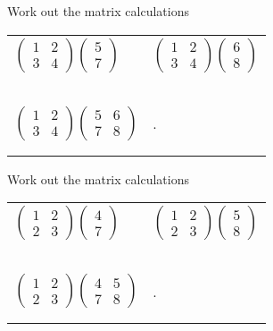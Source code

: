 \documentclass[fontsize=20pt]{scrartcl}
\begin{document}
\newpage
Work out the matrix calculations
\newline
\newline
\begin{tabular}{p{13cm}p{13cm}}
$\begin{pmatrix}1&2\\3&4\end{pmatrix} \begin{pmatrix}5\\7\end{pmatrix}$
&$\begin{pmatrix}1&2\\3&4\end{pmatrix} \begin{pmatrix}6\\8\end{pmatrix}$
\\\\\\
\\\\\\

$\begin{pmatrix}1&2\\3&4\end{pmatrix} \begin{pmatrix}5&6\\7&8\end{pmatrix}$
&.
\\\\\\
\end{tabular}
\newpage
Work out the matrix calculations
\newline
\newline
\begin{tabular}{p{13cm}p{13cm}}
$\begin{pmatrix}1&2\\2&3\end{pmatrix} \begin{pmatrix}4\\7\end{pmatrix}$
&$\begin{pmatrix}1&2\\2&3\end{pmatrix} \begin{pmatrix}5\\8\end{pmatrix}$
\\\\\\
\\\\\\

$\begin{pmatrix}1&2\\2&3\end{pmatrix} \begin{pmatrix}4&5\\7&8\end{pmatrix}$
&.
\\\\\\
\end{tabular}
\end{document}
